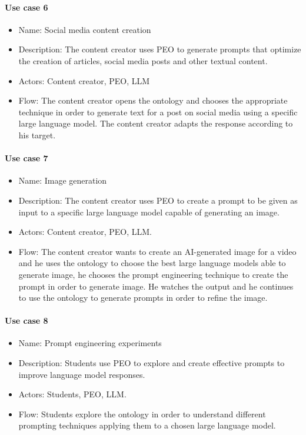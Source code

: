 \paragraph{Use case 6}
\begin{itemize}
    \item Name: Social media content creation
    \item Description: The content creator uses PEO to generate prompts that optimize the creation of articles, social media posts and other textual content.
    \item Actors:  Content creator, PEO, LLM
    \item Flow: The content creator opens the ontology and chooses the appropriate technique in order to generate text for a post on social media using a specific large language model. The content creator adapts the response according to his target.
\end{itemize}

\paragraph{Use case 7}
\begin{itemize}
    \item Name: Image generation
    \item Description: The content creator uses PEO to create a prompt to be given as input to a specific large language model capable of generating an image.
    \item Actors: Content creator, PEO, LLM.
    \item Flow: The content creator wants to create an AI-generated image for a video and he uses the ontology to choose the best large language models able to generate image, he chooses the prompt engineering technique to create the prompt in order to generate image. He watches the output and he continues to use the ontology to generate prompts in order to refine the image.
\end{itemize}

\paragraph{Use case 8}
\begin{itemize}
    \item Name: Prompt engineering experiments
    \item Description: Students use PEO to explore and create effective prompts to improve language model responses.
    \item Actors: Students, PEO, LLM.
    \item Flow: Students explore the ontology in order to understand different prompting techniques applying them to a chosen large language model.
\end{itemize}

